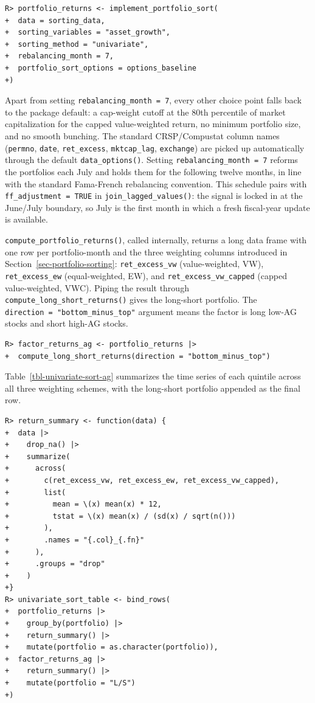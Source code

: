 \documentclass[
  article]{jss}
\begin{document}
\begin{verbatim}
R> portfolio_returns <- implement_portfolio_sort(
+  data = sorting_data,
+  sorting_variables = "asset_growth",
+  sorting_method = "univariate",
+  rebalancing_month = 7,
+  portfolio_sort_options = options_baseline
+)
\end{verbatim}

Apart from setting \texttt{rebalancing\_month\ =\ 7}, every other choice
point falls back to the package default: a cap-weight cutoff at the 80th
percentile of market capitalization for the capped value-weighted
return, no minimum portfolio size, and no smooth bunching. The standard
CRSP/Compustat column names (\texttt{permno}, \texttt{date},
\texttt{ret\_excess}, \texttt{mktcap\_lag}, \texttt{exchange}) are
picked up automatically through the default \texttt{data\_options()}.
Setting \texttt{rebalancing\_month\ =\ 7} reforms the portfolios each
July and holds them for the following twelve months, in line with the
standard Fama-French rebalancing convention. This schedule pairs with
\texttt{ff\_adjustment\ =\ TRUE} in \texttt{join\_lagged\_values()}: the
signal is locked in at the June/July boundary, so July is the first
month in which a fresh fiscal-year update is available.

\texttt{compute\_portfolio\_returns()}, called internally, returns a
long data frame with one row per portfolio-month and the three weighting
columns introduced in Section~\ref{sec-portfolio-sorting}:
\texttt{ret\_excess\_vw} (value-weighted, VW), \texttt{ret\_excess\_ew}
(equal-weighted, EW), and \texttt{ret\_excess\_vw\_capped} (capped
value-weighted, VWC). Piping the result through
\texttt{compute\_long\_short\_returns()} gives the long-short portfolio.
The \texttt{direction\ =\ "bottom\_minus\_top"} argument means the
factor is long low-AG stocks and short high-AG stocks.

\begin{verbatim}
R> factor_returns_ag <- portfolio_returns |>
+  compute_long_short_returns(direction = "bottom_minus_top")
\end{verbatim}

Table~\ref{tbl-univariate-sort-ag} summarizes the time series of each
quintile across all three weighting schemes, with the long-short
portfolio appended as the final row.

\begin{verbatim}
R> return_summary <- function(data) {
+  data |>
+    drop_na() |>
+    summarize(
+      across(
+        c(ret_excess_vw, ret_excess_ew, ret_excess_vw_capped),
+        list(
+          mean = \(x) mean(x) * 12,
+          tstat = \(x) mean(x) / (sd(x) / sqrt(n()))
+        ),
+        .names = "{.col}_{.fn}"
+      ),
+      .groups = "drop"
+    )
+}
R> univariate_sort_table <- bind_rows(
+  portfolio_returns |>
+    group_by(portfolio) |>
+    return_summary() |>
+    mutate(portfolio = as.character(portfolio)),
+  factor_returns_ag |>
+    return_summary() |>
+    mutate(portfolio = "L/S")
+)
\end{verbatim}
\end{document}
